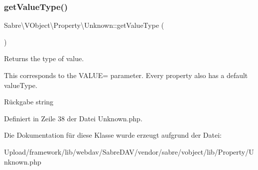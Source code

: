 \subsubsection{\texorpdfstring{get\+Value\+Type()}{getValueType()}}
{\footnotesize\ttfamily Sabre\textbackslash{}\+V\+Object\textbackslash{}\+Property\textbackslash{}\+Unknown\+::get\+Value\+Type (\begin{DoxyParamCaption}{ }\end{DoxyParamCaption})}

Returns the type of value.

This corresponds to the V\+A\+L\+UE= parameter. Every property also has a \textquotesingle{}default\textquotesingle{} value\+Type.

\begin{DoxyReturn}{Rückgabe}
string 
\end{DoxyReturn}


Definiert in Zeile 38 der Datei Unknown.\+php.



Die Dokumentation für diese Klasse wurde erzeugt aufgrund der Datei\+:\begin{DoxyCompactItemize}
\item 
Upload/framework/lib/webdav/\+Sabre\+D\+A\+V/vendor/sabre/vobject/lib/\+Property/Unknown.\+php\end{DoxyCompactItemize}
